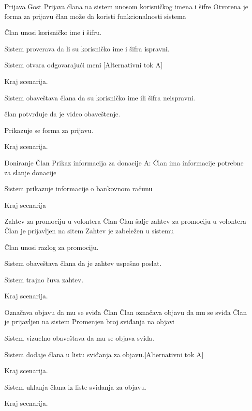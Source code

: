         {Prijava}
        {Gost}
        {Prijava člana na sistem unosom korisničkog imena i šifre}
        {Otvorena je forma za prijavu}
        {član može da koristi funkcionalnosti sistema}
        {
            \item Član unosi korisničko ime i šifru.
            \item Sistem proverava da li su korisničko ime i šifra ispravni.
            \item Sistem otvara odgovarajući meni [Alternativni tok A]
            \item Kraj scenarija.
        }
        {
            {
                \item Sistem obaveštava člana da su korisničko ime ili šifra neispravni.
                \item član potvrđuje da je video obaveštenje.
                \item Prikazuje se forma za prijavu.
                \item Kraj scenarija.
            }
        }

         {Doniranje}
         {Član}
         {Prikaz informacija za donacije}
         {}
         {A: Član ima informacije potrebne za slanje donacije}
         {
            \item Sistem prikazuje informacije o bankovnom računu
            \item Kraj scenarija
         }
         {}

         {Zahtev za promociju u volontera}
         {Član}
         {Član šalje zahtev za promociju u volontera}
         {Član je prijavljen na sitem}
         {Zahtev je zabeležen u sistemu}
         {
            \item Član unosi razlog za promociju.
            \item Sistem obaveštava člana da je zahtev uspešno poslat.
            \item Sistem trajno čuva zahtev.
            \item Kraj scenarija.
         }{}

         {Označava objavu da mu se sviđa}
         {Član}
         {Član označava objavu da mu se sviđa}
         {Član je prijavljen na sistem}
         {Promenjen broj sviđanja na objavi}
         {
            \item Sistem vizuelno obaveštava da mu se objava sviđa.
            \item Sistem dodaje člana u listu sviđanja za objavu.[Alternativni tok A]
            \item Kraj scenarija.
         }
         {
            {
                \item Sistem uklanja člana iz liste sviđanja za objavu.
                \item Kraj scenarija.
            }
         }


